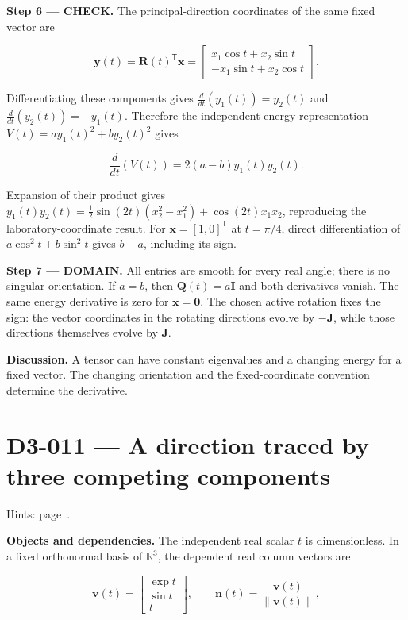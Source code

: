 \documentclass[11pt,oneside,openany]{book}
\begin{document}
\textbf{Step 6 --- CHECK.} The principal-direction coordinates of the same fixed vector are

\[
\mathbf y(t)=\mathbf R(t)^{\mathsf T}\mathbf x
=\begin{bmatrix}x_1\cos t+x_2\sin t\\-x_1\sin t+x_2\cos t\end{bmatrix}.
\]

Differentiating these components gives \(\frac{d}{dt}(y_1(t))=y_2(t)\) and \(\frac{d}{dt}(y_2(t))=-y_1(t)\). Therefore the independent energy representation \(V(t)=ay_1(t)^2+by_2(t)^2\) gives

\[
\frac{d}{dt}\left(V(t)\right)=2(a-b)y_1(t)y_2(t).
\]

Expansion of their product gives
\(y_1(t)y_2(t)=\tfrac12\sin(2t)(x_2^2-x_1^2)+\cos(2t)x_1x_2\), reproducing the laboratory-coordinate result. For \(\mathbf x=[1,0]^{\mathsf T}\) at \(t=\pi/4\), direct differentiation of \(a\cos^2t+b\sin^2t\) gives \(b-a\), including its sign.

\begin{DomainStep}
\textbf{Step 7 --- DOMAIN.} All entries are smooth for every real angle; there is no singular orientation. If \(a=b\), then \(\mathbf Q(t)=a\mathbf I\) and both derivatives vanish. The same energy derivative is zero for \(\mathbf x=\mathbf0\). The chosen active rotation fixes the sign: the vector coordinates in the rotating directions evolve by \(-\mathbf J\), while those directions themselves evolve by \(\mathbf J\).

\end{DomainStep}
\textbf{Discussion.} A tensor can have constant eigenvalues and a changing energy for a fixed vector. The changing orientation and the fixed-coordinate convention determine the derivative.
\clearpage
\section{D3-011 --- A direction traced by three competing components}
\label{problem:D3-011}
{\small Hints: page~\pageref{hints:D3-011}.}\par\medskip

\textbf{Objects and dependencies.} The independent real scalar \(t\) is dimensionless. In a fixed orthonormal basis of \(\mathbb R^3\), the dependent real column vectors are

\[
\mathbf v(t)=\begin{bmatrix}\exp t\\\sin t\\t\end{bmatrix},\qquad
\mathbf n(t)=\frac{\mathbf v(t)}{\|\mathbf v(t)\|},
\]
\end{document}
